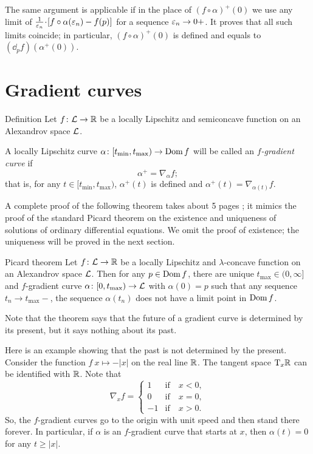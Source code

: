 The same argument is applicable if in the place of $(f\circ\alpha)^+(0)$
we use any limit of $\tfrac1{\eps_n}\cdot [f\circ\alpha(\eps_n)-f(p)]$ for a sequence $\varepsilon_n\to 0+$.
It proves that all such limits coincide; in particular, $(f\circ\alpha)^+(0)$ is defined and equals to $(\dd_pf)(\alpha^+(0))$.
\qeds


\section{Gradient curves}

\begin{thm}{Definition}\label{def:grad-curve}
Let $f\colon\mathcal{L}\to\mathbb{R}$ be a locally Lipschitz and semiconcave function on an Alexandrov space
$\mathcal{L}$.

A locally Lipschitz curve $\alpha\colon[t_{\min},t_{\max})\to\mathop{\rm Dom}\nolimits f$ will be called an \emph{$f$-gradient curve} if
\[\alpha^+=\nabla_{\alpha} f;\]
that is, for any $t\in[t_{\min},t_{\max})$, $\alpha^+(t)$ is defined and 
$\alpha^+(t)=\nabla_{\alpha(t)} f$.
\end{thm}

A complete proof of the following theorem takes about 5 pages \cite{alexander-kapovitch-petrunin2024}; 
it mimics the proof of the standard Picard theorem on the existence and uniqueness of solutions of ordinary differential equations.
We omit the proof of existence;
the uniqueness will be proved in the next section.


\begin{thm}{Picard theorem}\label{thm:glob-exist-grad-curv}
Let $f\colon\mathcal{L}\to \mathbb{R}$ be a locally Lipschitz and $\lambda$-concave function on an Alexandrov space $\mathcal{L}$.
Then for any $p\in \mathop{\rm Dom}\nolimits f$, there are unique $t_{\max}\in(0,\infty]$ and $f$-gradient curve $\alpha\colon[0,t_{\max})\to \mathcal{L}$ with $\alpha(0)=p$ such that any sequence $t_n\to t_{\max}-$, the sequence $\alpha(t_n)$ does not have a limit point in $\mathop{\rm Dom}\nolimits f$.
\end{thm}

Note that the theorem says that the future of a gradient curve is determined by its present, but it says nothing about its past.

Here is an example showing that the past is not determined by the present.
Consider the function $f\:x\mapsto -|x|$ on the real line $\mathbb{R}$.
The tangent space $\mathrm{T}_x\mathbb{R}$ can be identified with $\mathbb{R}$.
Note that 
\[\nabla_xf=
\begin{cases}
1&\text{if}\quad x<0,
\\
0&\text{if}\quad x=0,
\\
-1&\text{if}\quad x>0.
\end{cases}
\]
So, the $f$-gradient curves go to the origin with unit speed and then stand there forever.
In particular, if $\alpha$ is an $f$-gradient curve that starts at $x$,
then $\alpha(t)=0$ for any $t\ge |x|$.

